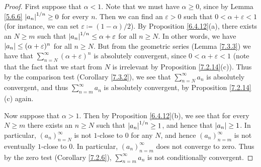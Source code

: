 \begin{proof}
    First suppose that \(\alpha < 1\).
    Note that we must have \(\alpha \geq 0\), since by Lemma \ref{5.6.6} \(\abs*{a_n}^{1 / n} \geq 0\) for every \(n\).
    Then we can find an \(\varepsilon > 0\) such that \(0 < \alpha + \varepsilon < 1\) (for instance, we can set \(\varepsilon \coloneqq (1 - \alpha) / 2\)).
    By Proposition \ref{6.4.12}(a), there exists an \(N \geq m\) such that \(\abs*{a_n}^{1 / n} \leq \alpha + \varepsilon\) for all \(n \geq N\).
    In other words, we have \(\abs*{a_n} \leq (\alpha + \varepsilon)^n\) for all \(n \geq N\).
    But from the geometric series (Lemma \ref{7.3.3}) we have that \(\sum_{n = N}^\infty (\alpha + \varepsilon)^n\) is absolutely convergent, since \(0 < \alpha + \varepsilon < 1\)
    (note that the fact that we start from \(N\) is irrelevant by Proposition \ref{7.2.14}(c)).
    Thus by the comparison test (Corollary \ref{7.3.2}), we see that \(\sum_{n = N}^\infty a_n\) is absolutely convergent, and thus \(\sum_{n = m}^\infty a_n\) is absolutely convergent, by Proposition \ref{7.2.14}(c) again.

    Now suppose that \(\alpha > 1\).
    Then by Proposition \ref{6.4.12}(b), we see that for every \(N \geq m\) there exists an \(n \geq N\) such that \(\abs*{a_n}^{1 / n} \geq 1\), and hence that \(\abs*{a_n} \geq 1\).
    In particular, \((a_n)_{n = N}^\infty\) is not \(1\)-close to \(0\) for any \(N\), and hence \((a_n)_{n = m}^\infty\) is not eventually \(1\)-close to \(0\).
    In particular, \((a_n)_{n = m}^\infty\) does not converge to zero.
    Thus by the zero test (Corollary \ref{7.2.6}), \(\sum_{n = m}^\infty a_n\) is not conditionally convergent.


\end{proof}
